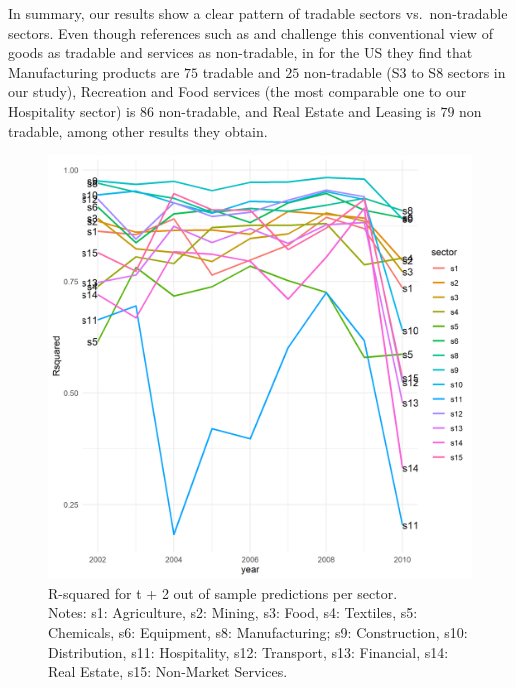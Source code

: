 \documentclass[]{interact}
\theoremstyle{plain}%
\theoremstyle{definition}
\theoremstyle{remark}
\begin{document}
In summary, our results show a clear pattern of tradable sectors
vs.~non-tradable sectors. Even though references such as
\citet{gervais2019tradability} and \citet{jensen2005} challenge this
conventional view of goods as tradable and services as non-tradable, in
\citet{gervais2019tradability} for the US they find that Manufacturing
products are \(75%
\) tradable and \(25%
\) non-tradable (S3 to S8 sectors in our study), Recreation and Food
services (the most comparable one to our Hospitality sector) is \(86%
\) non-tradable, and Real Estate and Leasing is \(79%
\) non tradable, among other results they obtain.

\begin{figure}[p]
\includegraphics[width=1\linewidth]{figures/sector_rsquared} \caption{\label{rsquared_sectors}R-squared for t + 2 out of sample predictions per sector.\\\hspace{\textwidth}\tiny Notes: s1: Agriculture, s2: Mining, s3: Food, s4: Textiles, s5: Chemicals, s6: Equipment, s8: Manufacturing; s9: Construction, s10: Distribution, s11: Hospitality, s12:  Transport, s13: Financial, s14: Real Estate, s15: Non-Market Services.}\label{fig:unnamed-chunk-9}
\end{figure}
\end{document}

